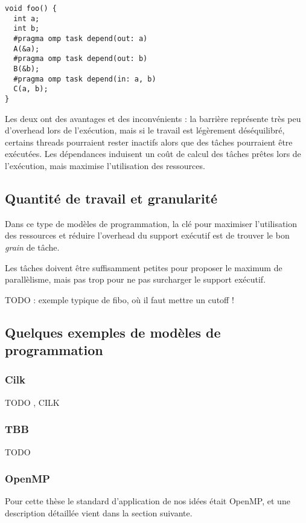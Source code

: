 \begin{lstlisting}[caption=Synchronisation via des dépendances,label=lst:context:task-dep]
void foo() {
  int a;
  int b;
  #pragma omp task depend(out: a)
  A(&a);
  #pragma omp task depend(out: b)
  B(&b);
  #pragma omp task depend(in: a, b)
  C(a, b);
}
\end{lstlisting}

Les deux ont des avantages et des inconvénients : la barrière représente très peu d'overhead lors de l'exécution, mais si le travail est légèrement déséquilibré, certains threads pourraient rester inactifs alors que des tâches pourraient être exécutées.
Les dépendances induisent un coût de calcul des tâches prêtes lors de l'exécution, mais maximise l'utilisation des ressources.

\subsection{Quantité de travail et granularité}

Dans ce type de modèles de programmation, la clé pour maximiser l'utilisation des ressources et réduire l'overhead du support exécutif est de trouver le bon \emph{grain} de tâche.

Les tâches doivent être suffisamment petites pour proposer le maximum de parallèlisme, mais pas trop pour ne pas surcharger le support exécutif.

TODO : exemple typique de fibo, où il faut mettre un cutoff !


\subsection{Quelques exemples de modèles de programmation}


\subsubsection{Cilk}

TODO
\cite{cilk5}, CILK

\subsubsection{TBB}

TODO

\subsubsection{OpenMP}

Pour cette thèse le standard d'application de nos idées était OpenMP, et une description détaillée vient dans la section suivante.

